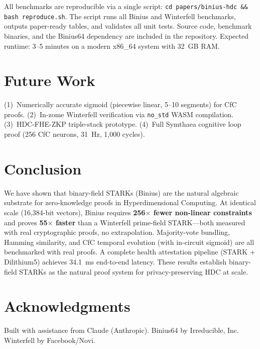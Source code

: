 \documentclass[11pt,twocolumn]{article}
\begin{document}
All benchmarks are reproducible via a single script:
\texttt{cd papers/binius-hdc \&\& bash reproduce.sh}. The script runs all Binius and Winterfell benchmarks, outputs paper-ready tables, and validates all unit tests. Source code, benchmark binaries, and the Binius64 dependency are included in the repository. Expected runtime: 3--5 minutes on a modern x86\_64 system with 32~GB RAM.

\section{Future Work}

(1)~Numerically accurate sigmoid (piecewise linear, 5--10 segments) for CfC proofs. (2)~In-zome Winterfell verification via \texttt{no\_std} WASM compilation. (3)~HDC-FHE-ZKP triple-stack prototype. (4)~Full Symthaea cognitive loop proof (256 CfC neurons, 31~Hz, 1,000 cycles).

\section{Conclusion}

We have shown that binary-field STARKs (Binius) are the natural algebraic substrate for zero-knowledge proofs in Hyperdimensional Computing. At identical scale (16,384-bit vectors), Binius requires \textbf{256$\times$ fewer non-linear constraints} and proves \textbf{55$\times$ faster} than a Winterfell prime-field STARK---both measured with real cryptographic proofs, no extrapolation. Majority-vote bundling, Hamming similarity, and CfC temporal evolution (with in-circuit sigmoid) are all benchmarked with real proofs. A complete health attestation pipeline (STARK + Dilithium5) achieves 34.1~ms end-to-end latency. These results establish binary-field STARKs as the natural proof system for privacy-preserving HDC at scale.

\section*{Acknowledgments}
Built with assistance from Claude (Anthropic). Binius64 by Irreducible, Inc. Winterfell by Facebook/Novi.
\end{document}
